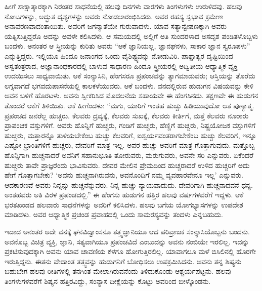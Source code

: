 ಹೀಗೆ ಸಾಕ್ಷಾತ್ಕಾರಕ್ಕಾಗಿ ನಿರಂತರ ಸಾಧನೆಯಲ್ಲಿ ಹಲವು ದಿನಗಳು ವಾರಗಳು ತಿಂಗಳುಗಳು ಉರುಳಿದವು. ಹಲವು ನೋಟಗಳನ್ನು, ಅದ್ಭುತ ದೃಶ್ಯಗಳನ್ನು ಅವರು ನೋಡಲಾರಂಭಿಸಿದರು. ಅವರ ರಹಸ್ಯ ಸ್ವಭಾವ ಕ್ರಮೇಣ ಅನಾವರಣವಾದಂತಾಯಿತು. ಅವರಿಗೆ ಜಗನ್ಮಾತೆಯೇ ಗುರುವಾದಳು. ಯಾವ ಸತ್ಯಾನ್ವೇಷಣಕ್ಕಾಗಿ ಅವರು ಯತ್ನಿಸುತ್ತಿದ್ದರೊ ಅದನ್ನು ಅವಳೇ ಕಲಿಸಿದಳು. ಆ ಸಮಯದಲ್ಲಿ ಅಲ್ಲಿಗೆ ಅತಿ ಸುಂದರಳಾದ ಅಸದೃಶ ಪಂಡಿತಳೊಬ್ಬಳು ಬಂದಳು. ಅನಂತರ ಆ ಸ್ತ್ರೀಯನ್ನು ಕುರಿತು ಅವರು “ಆಕೆ ಜ್ಞಾನಿಯಲ್ಲ, ಜ್ಞಾನಘನಳು, ಸಾಕಾರ ಜ್ಞಾನ ಸ್ವರೂಪಳು” ಎನ್ನುತ್ತಿದ್ದರು. ಇಲ್ಲಿಯೂ ಹಿಂದೂ ಜನಾಂಗದ ಒಂದು ವೈಶಿಷ್ಟ್ಯವನ್ನು ನೋಡುವಿರಿ. ಪಾಶ್ಚಾತ್ಯರ ದೃಷ್ಟಿಯಿಂದ ಅಸ್ವತಂತ್ರರಾದ, ಅಜ್ಞಾನಾಂಧಕಾರದಲ್ಲಿ ಬಾಳುವ ಸಾಧಾರಣ ಹಿಂದೂ ಸ್ತ್ರೀಯರಲ್ಲಿ ಅದ್ವಿತೀಯ ಆಧ್ಯಾತ್ಮಿಕ ವ್ಯಕ್ತಿ ಉದಯಿಸಲು ಸಾಧ್ಯವಾಯಿತು. ಆಕೆ ಸಂನ್ಯಾಸಿನಿ, ಹೆಂಗಸರೂ ಪ್ರಪಂಚವನ್ನು ತ್ಯಾಗಮಾಡುವರು; ಆಸ್ತಿಯನ್ನು ತೊರೆದು ಲಗ್ನವಾಗದೆ ಭಗವದುಪಾಸನೆಯಲ್ಲಿ ಕಾಲಕಳೆಯುವರು. ಆಕೆ ಬಂದಳು. ವನದಲ್ಲಿರುವ ಹುಡುಗನ ವಿಷಯವನ್ನು ಕೇಳಿ ಅವನ ಬಳಿಗೆ ಹೊರಟಳು. ಅವನು ಸ್ವೀಕರಿಸಿದ ಮೊದಲನೆಯ ಸಹಾಯವೇ ಈ ಹೆಂಗಸಿನದು. ತಕ್ಷಣವೇ ಈ ಹುಡುಗನ ತೊಂದರೆ ಆಕೆಗೆ ತಿಳಿಯಿತು. ಆಕೆ ಹೀಗೆಂದಳು: “ಮಗು, ಯಾರಿಗೆ ಇಂತಹ ಹುಚ್ಚು ಹಿಡಿಯುವುದೋ ಆತ ಪುಣ್ಯಾತ್ಮ. ಪ್ರಪಂಚದ ಜನರೆಲ್ಲ ಹುಚ್ಚರು. ಕೆಲವರು ದ್ರವ್ಯಕ್ಕೆ, ಕೆಲವರು ಸುಖಕ್ಕೆ, ಕೆಲವರು ಕೀರ್ತಿಗೆ, ಮತ್ತೆ ಕೆಲವರು ನೂರಾರು ಪ್ರಾಪಂಚಿಕ ವಸ್ತುಗಳಿಗೆ. ಅವರು ಹೊನ್ನಿಗೆ ಹುಚ್ಚರು, ಗಂಡಿಗೆ ಹುಚ್ಚರು, ಹೆಣ್ಣಿಗೆ ಹುಚ್ಚರು, ನಿಷ್ಟ್ರಯೋಜಕ ವಸ್ತುಗಳಿಗೆ ಹುಚ್ಚರು, ಮತ್ತಾರನ್ನೊ ತುಳಿಯಬೇಕೆಂಬ ಹುಚ್ಚು ಕೆಲವರಿಗೆ, ಐಶ್ವರ್ಯವಂತರಾಗಬೇಕೆಂಬ ಹುಚ್ಚು ಕೆಲವರಿಗೆ, ಇನ್ನೂ ಎಷ್ಟೋ ಭ್ರಾಂತಿಗಳಿಗೆ ಹುಚ್ಚರು, ದೇವರಿಗೆ ಮಾತ್ರ ಇಲ್ಲ. ಅವರ ಹುಚ್ಚು ಅವರಿಗೆ ಮಾತ್ರ ಗೊತ್ತಾಗುವುದು. ಮತ್ತೊಬ್ಬ ಹೊನ್ನಿಗಾಗಿ ಹುಚ್ಚನಾದರೆ ಅವನಿಗೆ ಸಹಾನುಭೂತಿ ತೋರುವರು, ಮರುಗುವರು, ಅವನೇ ಸರಿ ಎನ್ನುವರು. ಏಕೆಂದರೆ ಹುಚ್ಚರು ತಾವೇ ಪ್ರಾಜ್ಞರೆಂದು ಭಾವಿಸುವರು. ದೇವರ ಮೇಲಿನ ಪ್ರೇಮದಿಂದ ಹುಚ್ಚರಾದರೆ ಉಳಿದ ಹುಚ್ಚರಿಗೆ ಅದು ಹೇಗೆ ಗೊತ್ತಾಗಬೇಕು? ‘ಅವನು ಹುಚ್ಚನಾಗಿರುವನು, ಅವನೊಂದಿಗೆ ನಮ್ಮ ವ್ಯವಹಾರವೇನೂ ಇಲ್ಲ’ ಎನ್ನುವರು. ಆದಕಾರಣವೆ ಅವರು ನಿನ್ನನ್ನು ಹುಚ್ಚನೆನ್ನುವರು. ನಿನ್ನ ಹುಚ್ಚು ನ್ಯಾಯವಾದುದು. ದೇವರಿಗಾಗಿ ಹುಚ್ಚನಾದವನೆ ಧನ್ಯ. ಅಂತಹವರು ಅತಿ ವಿರಳ ಪ್ರಪಂಚದಲ್ಲಿ.” ಈ ಹೆಂಗಸು ಹುಡುಗನ ಹತ್ತಿರ ಹಲವು ವರ್ಷಗಳವರೆಗೆ ಇದ್ದಳು. ಆಕೆ ಭರತಖಂಡದ ಹಲವಾರು ಸಾಧನೆಗಳನ್ನು ಅವರಿಗೆ ಕಲಿಸಿದಳು. ಹಲವು ಬಗೆಯ ಯೋಗಭ್ಯಾಸಗಳನ್ನು ಉಪದೇಶ ಮಾಡಿದಳು. ಅವರ ಆಧ್ಯಾತ್ಮಿಕ ಪ್ರಚಂಡ ಪ್ರವಾಹದಲ್ಲಿ ಒಂದು ಸಾಮರಸ್ಯವನ್ನು ತಂದಳು ಎನ್ನಬಹುದು.

ಇದಾದ ಅನಂತರ ಅದೇ ವನಕ್ಕೆ ಘನವಿದ್ವಾಂಸನೂ ತತ್ತ್ವಜ್ಞಾನಿಯೂ ಆದ ಪರಿವ್ರಾಜಕ ಸಂನ್ಯಾಸಿಯೊಬ್ಬನು ಬಂದನು. ಅವನೊಬ್ಬ ವಿಚಿತ್ರ ವ್ಯಕ್ತಿ, ಜ್ಞಾನಿ, ಸತ್ಯವಾಗಿಯೂ ಪ್ರಪಂಚವಿದೆ ಎಂಬುದನ್ನು ಅವನು ನಂಬಿಯೇ ಇರಲಿಲ್ಲ. ಇದನ್ನು ಪ್ರಕಟಿಸುವುದಕ್ಕಾಗಿ ಅವನು ಯಾವ ಚಾವಣಿಯ ಕೆಳಗೂ ಹೋಗುತ್ತಿರಲಿಲ್ಲ. ಯಾವಾಗಲೂ ಮಳೆ ಬಿಸಿಲಿನಲ್ಲಿ ಹೊರಗೇ ಇರುತ್ತಿದ್ದನು. ಈತನು ವೇದಾಂತ ತತ್ತ್ವವನ್ನು ಹುಡುಗನಿಗೆ ಬೋಧಿಸಲು ಉಪಕ್ರಮಿಸಿದನು. ಅವನು ತನ್ನ ಶಿಷ್ಯನು ಬಹುಬೇಗ ಹಲವು ರೀತಿಗಳಲ್ಲಿ ತನಗಿಂತ ಮೇಲಾಗಿರುವನೆಂದು ತಿಳಿದುಕೊಂಡು ಆಶ್ಚರ್ಯಪಟ್ಟನು. ಹಲವು ತಿಂಗಳುಗಳವರೆಗೆ ಶಿಷ್ಯನ ಹತ್ತಿರವಿದ್ದು, ಸಂನ್ಯಾಸ ದೀಕ್ಷೆಯನ್ನು ಕೊಟ್ಟು ಅವರಿಂದ ಬೀಳ್ಕೊಂಡನು.

